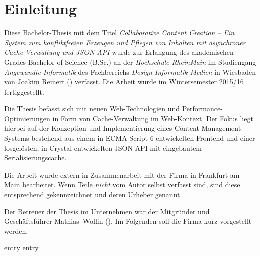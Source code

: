 \chapter{Einleitung}
\label{chap:einleitung}

Diese Bachelor-Thesis mit dem Titel \emph{Collaborative Content Creation -- Ein
System zum konfliktfreien Erzeugen und Pflegen von Inhalten mit asynchroner
Cache-Verwaltung und JSON-API} wurde zur Erlangung des akademischen Grades
Bachelor of Science (B.Sc.) an der \emph{Hochschule RheinMain} im Studiengang
\emph{Angewandte Informatik} des Fachbereichs \emph{Design Informatik Medien}
in Wiesbaden von Joakim Reinert () verfasst.  Die
Arbeit wurde im Wintersemester 2015/16 fertiggestellt.

Die Thesis befasst sich mit neuen Web-Technologien und
Performance-Optimierungen in Form von Cache-Verwaltung im Web-Kontext.  Der
Fokus liegt hierbei auf der Konzeption und Implementierung eines
Content-Management-Systems bestehend aus einem in ECMA-Script-6 entwickelten
Frontend und einer losgelösten, in Crystal entwickelten JSON-API mit
eingebautem Serialisierungscache.

Die Arbeit wurde extern in Zusammenarbeit mit der Firma \emph{\mesods} in
Frankfurt am Main bearbeitet.  Wenn Teile \emph{nicht} vom Autor selbst
verfasst sind, sind diese entsprechend gekennzeichnet und deren Urheber
genannt.

Der Betreuer der Thesis im Unternehmen war der Mitgründer und Geschäftsführer
\mbox{Mathias Wollin} ().  Im Folgenden soll die Firma
kurz vorgestellt werden.

{entry}
{entry}
